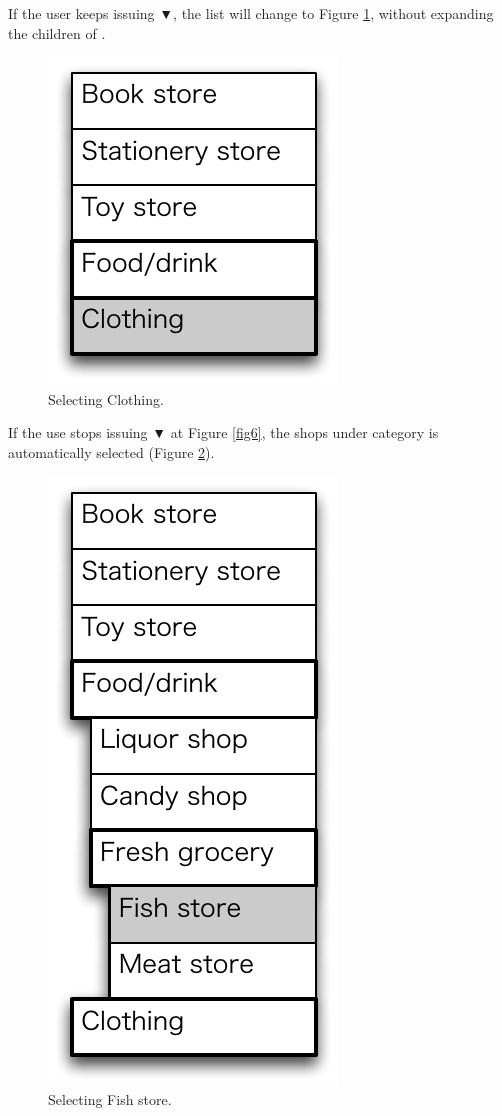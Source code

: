 \documentclass{article}
\def\down{▼}
\begin{document}
If the user keeps issuing {\down}, 
the list will change to Figure \ref{fig8},
without expanding the children of .

\begin{figure}[H]
\centerline{\includegraphics[width=\menuwidth,bb=0 0 139 157]{figures/fig8.pdf}}
\caption{Selecting Clothing.}
\label{fig8}
\end{figure}

If the use stops issuing {\down} at Figure \ref{fig6},
the shops under category  is automatically selected (Figure \ref{fig7}).

\begin{figure}[H]
\centerline{\includegraphics[width=\menuwidth,bb=0 0 139 292]{figures/fig7.pdf}}
\caption{Selecting Fish store.}
\label{fig7}
\end{figure}
\end{document}
